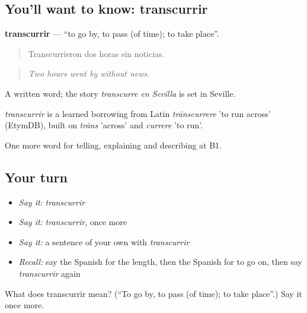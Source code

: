 \subsection*{You'll want to know: transcurrir}
\textbf{transcurrir} — \textquotedblleft{}to go by, to pass (of time); to take place\textquotedblright{}.

\begin{quote}
Transcurrieron dos horas sin noticias.
\end{quote}

\begin{quote}
\emph{Two hours went by without news.}
\end{quote}

A written word; the story \emph{transcurre en Sevilla} is set in Seville.

\begin{cousinweb}
\emph{transcurrir} is a learned borrowing from Latin \emph{trānscurrere} 'to run across' (EtymDB), built on \emph{trāns} 'across' and \emph{currere} 'to run'.
\end{cousinweb}

\begin{grammarlens}[title={What you've built}]
One more word for telling, explaining and describing at B1.
\end{grammarlens}

\subsection*{Your turn}
\begin{itemize}
\raggedright
  \item \emph{Say it:} \emph{transcurrir}
  \item \emph{Say it:} \emph{transcurrir}, once more
  \item \emph{Say it:} a sentence of your own with \emph{transcurrir}
  \item \emph{Recall:} say the Spanish for the length, then the Spanish for to go on, then say \emph{transcurrir} again
\end{itemize}

\begin{tcolorbox}[breakable,colback=teal!4,colframe=teal!35!black,title={Before you move on}]
What does transcurrir mean? (\textquotedblleft{}To go by, to pass (of time); to take place\textquotedblright{}.) Say it once more.
\end{tcolorbox}
